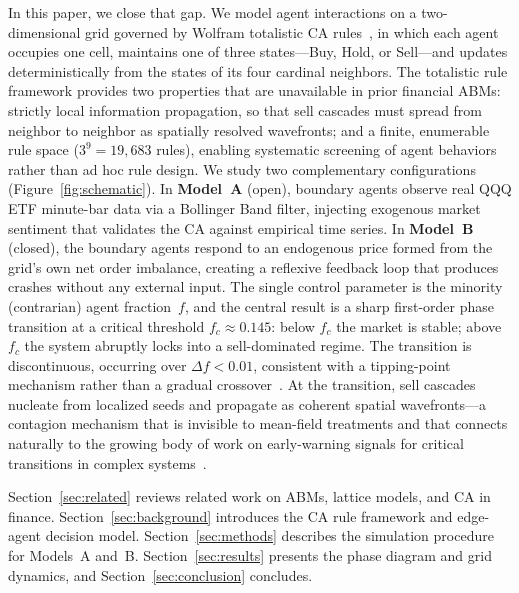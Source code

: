 \documentclass{article}
\theoremstyle{definition}
\theoremstyle{remark}
\begin{document}
In this paper, we close that gap. We model agent interactions on a two-dimensional grid
governed by Wolfram totalistic CA rules~\cite{wolfram2002new}, in which each agent occupies
one cell, maintains one of three states---Buy, Hold, or Sell---and updates deterministically
from the states of its four cardinal neighbors. The totalistic rule framework provides two
properties that are unavailable in prior financial ABMs: strictly local information
propagation, so that sell cascades must spread from neighbor to neighbor as spatially resolved
wavefronts; and a finite, enumerable rule space ($3^9 = 19{,}683$ rules), enabling systematic
screening of agent behaviors rather than ad hoc rule design. We study two complementary
configurations (Figure~\ref{fig:schematic}). In \textbf{Model~A} (open), boundary agents
observe real QQQ ETF minute-bar data via a Bollinger Band filter, injecting exogenous market
sentiment that validates the CA against empirical time series. In \textbf{Model~B} (closed),
the boundary agents respond to an endogenous price formed from the grid's own net order
imbalance, creating a reflexive feedback loop that produces crashes without any external input.
The single control parameter is the minority (contrarian) agent fraction~$f$, and the central
result is a sharp first-order phase transition at a critical threshold $f_c \approx 0.145$:
below $f_c$ the market is stable; above $f_c$ the system abruptly locks into a sell-dominated
regime. The transition is discontinuous, occurring over $\Delta f < 0.01$, consistent with a
tipping-point mechanism rather than a gradual crossover~\cite{scheffer2009early}. At the
transition, sell cascades nucleate from localized seeds and propagate as coherent spatial
wavefronts---a contagion mechanism that is invisible to mean-field treatments and that
connects naturally to the growing body of work on early-warning signals for critical
transitions in complex systems~\cite{scheffer2009early,battiston2016complexity}.

Section~\ref{sec:related} reviews related work on ABMs, lattice models, and CA in finance.
Section~\ref{sec:background} introduces the CA rule framework and edge-agent decision model.
Section~\ref{sec:methods} describes the simulation procedure for Models~A and~B.
Section~\ref{sec:results} presents the phase diagram and grid dynamics, and
Section~\ref{sec:conclusion} concludes.
\end{document}
